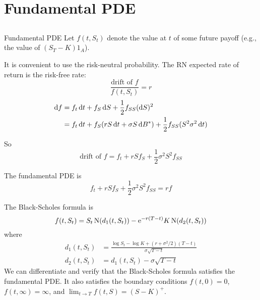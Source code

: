 \documentclass[xcolor=dvipsnames,10pt]{beamer}
\begin{document}
\section{Fundamental PDE}\subsection{}
\begin{frame}{Fundamental PDE}
    Let $f(t,S_t)$ denote the value at $t$ of some future payoff (e.g., the value of $(S_T-K)1_A$). 
    
    It is convenient to use the risk-neutral probability.  The RN expected rate of return is the risk-free rate:
    $$\frac{\text{drift of $f$}}{f(t,S_t)} = r$$
    \pause
   \begin{align*}
       \mathrm{d} f &= f_t\,\mathrm{d} t + f_S\,\mathrm{d} S 
       + \frac{1}{2}f_{SS}(\mathrm{d} S)^2\\
       &= f_t\,\mathrm{d} t + f_S(rS\,\mathrm{d} t + \sigma S\,\mathrm{d} B^*)
       + \frac{1}{2}f_{SS}(S^2\sigma^2\,\mathrm{d} t)
   \end{align*}
   
   \pause
   So 
   $$\text{drift of $f$} = f_t + rSf_S + \frac{1}{2}\sigma^2S^2f_{SS}$$
\end{frame}

\begin{frame}[plain]
The fundamental PDE is
\begin{equation}\tag{$\star$}
f_t + rSf_S + \frac{1}{2}\sigma^2S^2f_{SS} = rf
\end{equation}

\pause

The Black-Scholes formula is
$$f(t,S_t) = S_t\operatorname{N}(d_1(t,S_t)) - \mathrm{e}^{-r(T-t)}K\operatorname{N}(d_2(t,S_t))$$
where
\begin{align*}
    d_1(t,S_t) &= \frac{\log S_t - \log K + (r+\sigma^2/2)(T-t)}{\sigma\sqrt{T-t}}\\
    d_2(t,S_t) &= d_1(t,S_t) - \sigma\sqrt{T-t}
\end{align*}
We can differentiate and verify that the Black-Scholes formula satisfies the fundamental PDE.  It also satisfies the boundary conditions $f(t,0)=0$, $f(t,\infty)=\infty$, and 
$\lim_{t\rightarrow T}f(t,S) = (S-K)^+$.
\end{frame}
\end{document}
